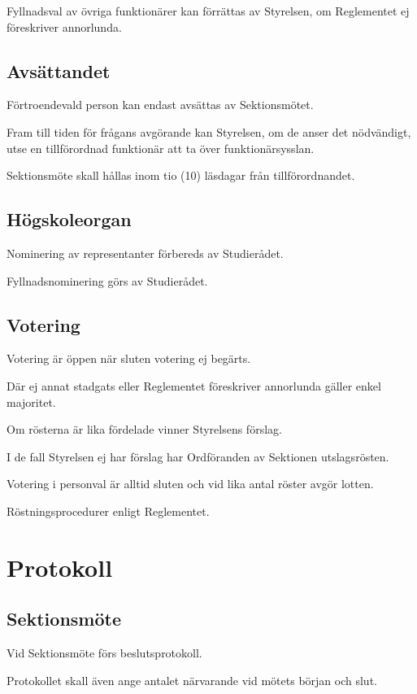 \documentclass[10pt]{article}
\begin{document}
    Fyllnadsval av övriga funktionärer kan förrättas av Styrelsen, om
    Reglementet ej föreskriver annorlunda.
    
    \subsection{Avsättandet}
    Förtroendevald person kan endast avsättas av Sektionsmötet.
    
    Fram till tiden för frågans avgörande kan Styrelsen, om de anser det
    nödvändigt, utse en tillförordnad funktionär att ta över funktionärsysslan.
    
    Sektionsmöte skall hållas inom tio (10) läsdagar från tillförordnandet.
    
    \subsection{Högskoleorgan}
    Nominering av representanter förbereds av Studierådet.
    
    Fyllnadsnominering görs av Studierådet.
    
    \subsection{Votering}
    Votering är öppen när sluten votering ej begärts.
    
    Där ej annat stadgats eller Reglementet föreskriver annorlunda gäller enkel
    majoritet.
    
    Om rösterna är lika fördelade vinner Styrelsens förslag.
    
    I de fall Styrelsen ej har förslag har Ordföranden av Sektionen utslagsrösten.
    
    Votering i personval är alltid sluten och vid lika antal röster avgör lotten.
    
    Röstningsprocedurer enligt Reglementet.
    \newpage
    
    \section{Protokoll}
    \subsection{Sektionsmöte}
    Vid Sektionsmöte förs beslutsprotokoll.
    
    Protokollet skall även ange antalet närvarande vid mötets början och slut.
    
\end{document}
